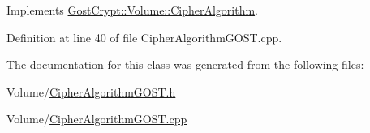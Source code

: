 Implements \hyperlink{class_gost_crypt_1_1_volume_1_1_cipher_algorithm_a1be05f68ce3c18e7cd76708739f3f85a}{Gost\+Crypt\+::\+Volume\+::\+Cipher\+Algorithm}.



Definition at line 40 of file Cipher\+Algorithm\+G\+O\+S\+T.\+cpp.



The documentation for this class was generated from the following files\+:\begin{DoxyCompactItemize}
\item 
Volume/\hyperlink{_cipher_algorithm_g_o_s_t_8h}{Cipher\+Algorithm\+G\+O\+S\+T.\+h}\item 
Volume/\hyperlink{_cipher_algorithm_g_o_s_t_8cpp}{Cipher\+Algorithm\+G\+O\+S\+T.\+cpp}\end{DoxyCompactItemize}

